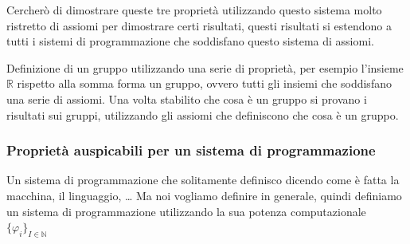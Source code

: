 \documentclass{article}
\begin{document}
Cercherò di dimostrare queste tre proprietà utilizzando questo sistema molto ristretto di assiomi
per dimostrare certi risultati, questi risultati si estendono a tutti i sistemi di programmazione che
soddisfano questo sistema di assiomi.

Definizione di un gruppo utilizzando una serie di proprietà,
per esempio l'insieme $\mathbb{R}$ rispetto alla somma forma un gruppo, ovvero tutti gli insiemi che
soddisfano una serie di assiomi.
Una volta stabilito che cosa è un gruppo si provano i risultati sui gruppi, utilizzando gli assiomi
che definiscono che cosa è un gruppo.

\subsubsection{Proprietà auspicabili per un sistema di programmazione}
Un sistema di programmazione che solitamente definisco dicendo come è fatta la macchina, il linguaggio, \dots
Ma noi vogliamo definire in generale, quindi definiamo un sistema di programmazione utilizzando la sua potenza
computazionale $\{\varphi_i\}_{I\in\mathbb{N}}$
\end{document}
